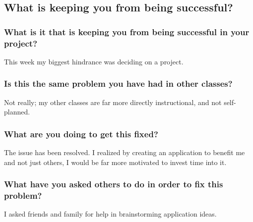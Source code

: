 \documentclass[letterpaper]{article}            %
\begin{document}

\subsection{What is keeping you from being successful?}

\subsubsection{What is it that is keeping you from being successful in your project?}

This week my biggest hindrance was deciding on a project.

\subsubsection{Is this the same problem you have had in other classes?}

Not really; my other classes are far more directly instructional, and not self-planned.

\subsubsection{What are you doing to get this fixed?}

The issue has been resolved. I realized by creating an application to benefit me and not just others, I would be far more motivated to invest time into it.

\subsubsection{What have you asked others to do in order to fix this problem?}

I asked friends and family for help in brainstorming application ideas.
\end{document}
